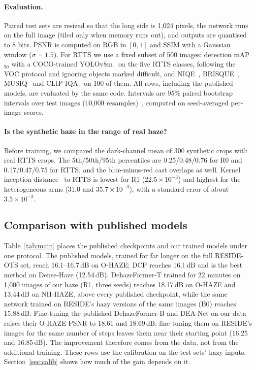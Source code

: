 \documentclass{article}
\begin{document}
\paragraph{Evaluation.} Paired test sets are resized so that the long side is 1{,}024 pixels, the network runs on the full image (tiled only when memory runs out), and outputs are quantised to 8 bits. PSNR is computed on RGB in $[0,1]$ and SSIM with a Gaussian window ($\sigma=1.5$). For RTTS we use a fixed subset of 500 images: detection mAP$_{50}$ with a COCO-trained YOLOv8m~\cite{jocher2023yolov8} on the five RTTS classes, following the VOC protocol and ignoring objects marked difficult, and NIQE~\cite{mittal2013niqe}, BRISQUE~\cite{mittal2012brisque}, MUSIQ~\cite{ke2021musiq} and CLIP-IQA~\cite{wang2023clipiqa} on 100 of them. All rows, including the published models, are evaluated by the same code. Intervals are 95\% paired bootstrap intervals over test images (10{,}000 resamples)~\cite{efron1993bootstrap}, computed on seed-averaged per-image scores.

\paragraph{Is the synthetic haze in the range of real haze?} Before training, we compared the dark-channel mean of 300 synthetic crops with real RTTS crops. The 5th/50th/95th percentiles are 0.25/0.48/0.76 for R0 and 0.17/0.47/0.75 for RTTS, and the blue-minus-red cast overlaps as well. Kernel inception distance~\cite{binkowski2018kid} to RTTS is lowest for R1 ($22.5\times10^{-3}$) and highest for the heterogeneous arms (31.0 and $35.7\times10^{-3}$), with a standard error of about $3.5\times10^{-3}$.

\subsection{Comparison with published models}
Table~\ref{tab:main} places the published checkpoints and our trained models under one protocol. The published models, trained for far longer on the full RESIDE-OTS set, reach 16.1--16.7\,dB on O-HAZE; DCP reaches 16.1\,dB and is the best method on Dense-Haze (12.54\,dB). DehazeFormer-T trained for 22 minutes on 1{,}000 images of our haze (R1, three seeds) reaches 18.17\,dB on O-HAZE and 13.44\,dB on NH-HAZE, above every published checkpoint, while the same network trained on RESIDE's hazy versions of the same images (B0) reaches 15.88\,dB. Fine-tuning the published DehazeFormer-B and DEA-Net on our data raises their O-HAZE PSNR to 18.61 and 18.69\,dB; fine-tuning them on RESIDE's images for the same number of steps leaves them near their starting point (16.25 and 16.85\,dB). The improvement therefore comes from the data, not from the additional training. These rows use the calibration on the test sets' hazy inputs; Section~\ref{sec:calib} shows how much of the gain depends on it.
\end{document}
